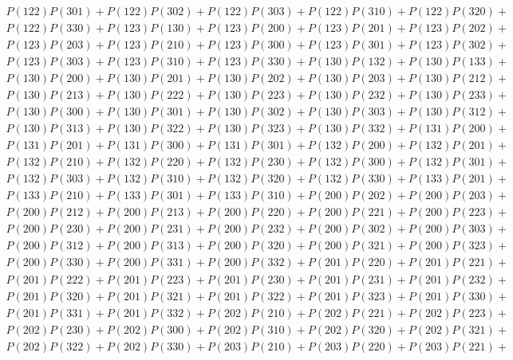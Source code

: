 \documentclass{article}
\theoremstyle{definition}
\begin{document}
\begin{gather*}
        P(122)P(301) + P(122)P(302) + P(122)P(303) + P(122)P(310) + P(122)P(320) +\\
        P(122)P(330) + P(123)P(130) + P(123)P(200) + P(123)P(201) + P(123)P(202) +\\
        P(123)P(203) + P(123)P(210) + P(123)P(300) + P(123)P(301) + P(123)P(302) +\\
        P(123)P(303) + P(123)P(310) + P(123)P(330) + P(130)P(132) + P(130)P(133) +\\
        P(130)P(200) + P(130)P(201) + P(130)P(202) + P(130)P(203) + P(130)P(212) +\\
        P(130)P(213) + P(130)P(222) + P(130)P(223) + P(130)P(232) + P(130)P(233) +\\
        P(130)P(300) + P(130)P(301) + P(130)P(302) + P(130)P(303) + P(130)P(312) +\\
        P(130)P(313) + P(130)P(322) + P(130)P(323) + P(130)P(332) + P(131)P(200) +\\
        P(131)P(201) + P(131)P(300) + P(131)P(301) + P(132)P(200) + P(132)P(201) +\\
        P(132)P(210) + P(132)P(220) + P(132)P(230) + P(132)P(300) + P(132)P(301) +\\
        P(132)P(303) + P(132)P(310) + P(132)P(320) + P(132)P(330) + P(133)P(201) +\\
        P(133)P(210) + P(133)P(301) + P(133)P(310) + P(200)P(202) + P(200)P(203) +\\
        P(200)P(212) + P(200)P(213) + P(200)P(220) + P(200)P(221) + P(200)P(223) +\\
        P(200)P(230) + P(200)P(231) + P(200)P(232) + P(200)P(302) + P(200)P(303) +\\
        P(200)P(312) + P(200)P(313) + P(200)P(320) + P(200)P(321) + P(200)P(323) +\\
        P(200)P(330) + P(200)P(331) + P(200)P(332) + P(201)P(220) + P(201)P(221) +\\
        P(201)P(222) + P(201)P(223) + P(201)P(230) + P(201)P(231) + P(201)P(232) +\\
        P(201)P(320) + P(201)P(321) + P(201)P(322) + P(201)P(323) + P(201)P(330) +\\
        P(201)P(331) + P(201)P(332) + P(202)P(210) + P(202)P(221) + P(202)P(223) +\\
        P(202)P(230) + P(202)P(300) + P(202)P(310) + P(202)P(320) + P(202)P(321) +\\
        P(202)P(322) + P(202)P(330) + P(203)P(210) + P(203)P(220) + P(203)P(221) +\\

\end{gather*}
\end{document}
